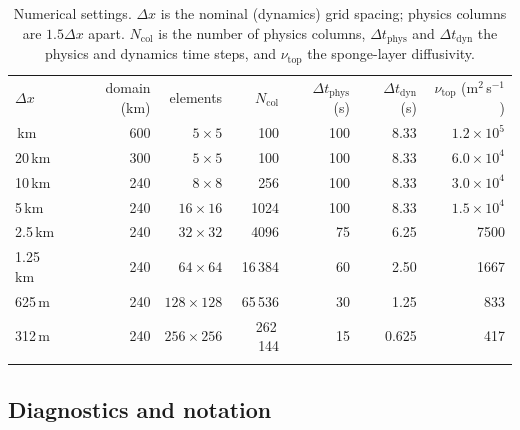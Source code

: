 \documentclass[acp, manuscript]{copernicus}
\newcommand{\dx}{\Delta x}
\begin{document}
\begin{table}[t]
\caption{Numerical settings. $\dx$ is the nominal (dynamics) grid spacing; physics columns are $1.5\dx$ apart. $N_\mathrm{col}$ is the number of physics columns, $\Delta t_\mathrm{phys}$ and $\Delta t_\mathrm{dyn}$ the physics and dynamics time steps, and $\nu_\mathrm{top}$ the sponge-layer diffusivity.}\label{tab:numerics}
\begin{tabular}{lrrrrrr}
\tophline
$\dx$ & domain (km) & elements & $N_\mathrm{col}$ & $\Delta t_\mathrm{phys}$ (s) & $\Delta t_\mathrm{dyn}$ (s) & $\nu_\mathrm{top}$ (m$^2$\,s$^{-1}$) \\
\middlehline
40\,km & 600 & $5\times5$ & 100 & 100 & 8.33 & $1.2\times10^5$ \\
20\,km & 300 & $5\times5$ & 100 & 100 & 8.33 & $6.0\times10^4$ \\
10\,km & 240 & $8\times8$ & 256 & 100 & 8.33 & $3.0\times10^4$ \\
5\,km & 240 & $16\times16$ & 1024 & 100 & 8.33 & $1.5\times10^4$ \\
2.5\,km & 240 & $32\times32$ & 4096 & 75 & 6.25 & 7500 \\
1.25\,km & 240 & $64\times64$ & 16\,384 & 60 & 2.50 & 1667 \\
625\,m & 240 & $128\times128$ & 65\,536 & 30 & 1.25 & 833 \\
312\,m & 240 & $256\times256$ & 262\,144 & 15 & 0.625 & 417 \\
\bottomhline
\end{tabular}
\end{table}

\subsection{Diagnostics and notation}\label{sec:diag}
\end{document}
